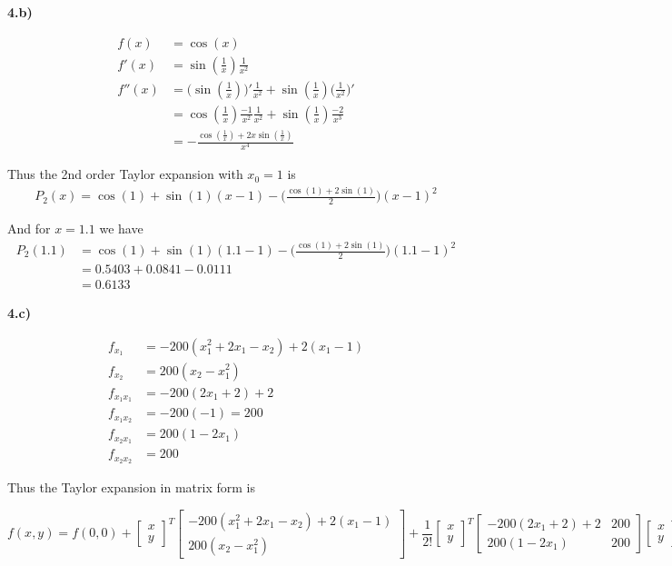 \textbf{4.b)}

\begin{align*}
f(x) &= \cos(x) \\
f'(x) &= \sin(\frac{1}{x}) \frac{1}{x^2}\\
f''(x) &= \Big( \sin(\frac{1}{x}) \Big)' \frac{1}{x^2} + \sin(\frac{1}{x}) \Big( \frac{1}{x^2}\Big)'\\
&= \cos(\frac{1}{x})\frac{-1}{x^2}\frac{1}{x^2} + \sin(\frac{1}{x}) \frac{-2}{x^3}\\
&= -\frac{\cos(\frac{1}{x}) + 2x\sin(\frac{1}{x})}{x^4}
\end{align*}

Thus the 2nd order Taylor expansion with $x_0 = 1$ is
\begin{align*}
P_2(x) = \cos(1) + \sin(1)(x-1) - \Big( \frac{\cos(1)+2\sin(1)}{2} \Big)(x - 1)^2
\end{align*}

And for $x = 1.1$ we have
\begin{align*}
P_2(1.1) &= \cos(1) + \sin(1)(1.1-1) - \Big( \frac{\cos(1)+2\sin(1)}{2} \Big)(1.1 - 1)^2\\
&= 0.5403 + 0.0841 - 0.0111\\
&= 0.6133
\end{align*}

\pagebreak

\textbf{4.c)}

\begin{align*}
f_{x_1} &= -200(x_1^2 + 2x_1 - x_2) + 2(x_1 -1)  \\
f_{x_2} &= 200(x_2 - x_1^2)\\
f_{x_1 x_1} &= -200 (2x_1 + 2) + 2\\
f_{x_1 x_2} &= -200(-1) = 200\\
f_{x_2 x_1} &=  200(1-2x_1)\\
f_{x_2 x_2} &= 200
\end{align*}

Thus the Taylor expansion in matrix form is

\[
f(x,y) = f(0,0) +
	\begin{bmatrix}
	x \\
	y
	\end{bmatrix}^T
	\begin{bmatrix}
		-200(x_1^2 + 2x_1 - x_2) + 2(x_1 -1) \\
		200(x_2 - x_1^2)
	\end{bmatrix}
+ \frac{1}{2!}
	\begin{bmatrix}
	x \\
	y
	\end{bmatrix}^T
	\begin{bmatrix}
    	-200 (2x_1 + 2) + 2 & 200\\
    	200(1-2x_1) & 200
	\end{bmatrix}	
	\begin{bmatrix}
	x \\
	y
	\end{bmatrix}
\]

